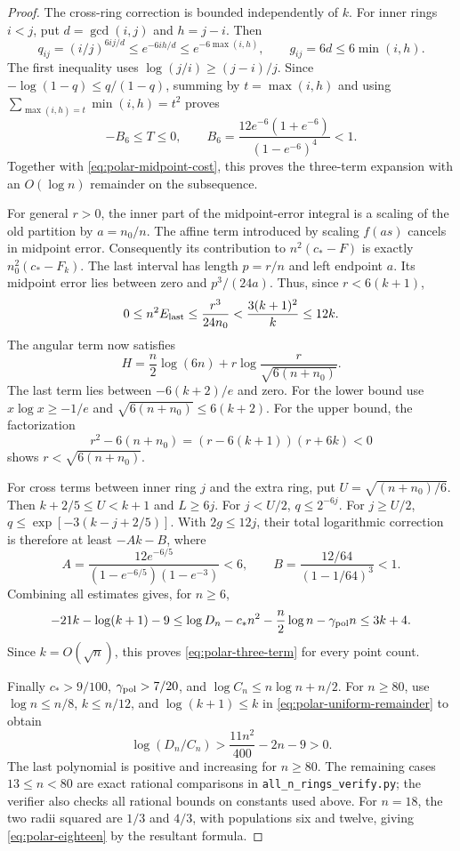 \documentclass[11pt]{article}
\theoremstyle{remark}
\numberwithin{equation}{section}
\begin{document}
\begin{proof}
The cross-ring correction is bounded independently of $k$.
For inner rings $i<j$, put $d=\gcd(i,j)$ and $h=j-i$.
Then
\[
 q_{ij}=(i/j)^{6ij/d}
 \le e^{-6ih/d}\le e^{-6\max(i,h)},
 \qquad g_{ij}=6d\le6\min(i,h).
\]
The first inequality uses $\log(j/i)\ge(j-i)/j$.
Since $-\log(1-q)\le q/(1-q)$, summing by
$t=\max(i,h)$ and using
$\sum_{\max(i,h)=t}\min(i,h)=t^2$ proves
\begin{equation}\label{eq:polar-cross-constant}
 -B_6\le T\le0,\qquad
 B_6=\frac{12e^{-6}(1+e^{-6})}{(1-e^{-6})^4}<1.
\end{equation}
Together with \eqref{eq:polar-midpoint-cost}, this proves the
three-term expansion with an $O(\log n)$ remainder on the
subsequence.

For general $r>0$, the inner part of the midpoint-error integral
is a scaling of the old partition by $a=n_0/n$.
The affine term introduced by scaling $f(as)$ cancels in midpoint
error.  Consequently its contribution to $n^2(c_*-F)$ is
exactly $n_0^2(c_*-F_k)$.
The last interval has length $p=r/n$ and left endpoint $a$.
Its midpoint error lies between zero and $p^3/(24a)$.
Thus, since $r<6(k+1)$,
\[
 0\le n^2E_{\rm last}\le\frac{r^3}{24n_0}
 <\frac{3(k+1)^2}{k}\le12k.
\]
The angular term now satisfies
\[
 H=\frac n2\log(6n)
 +r\log\frac r{\sqrt{6(n+n_0)}}.
\]
The last term lies between $-6(k+2)/e$ and zero.
For the lower bound use $x\log x\ge-1/e$ and
$\sqrt{6(n+n_0)}\le6(k+2)$.
For the upper bound, the factorization
\[
 r^2-6(n+n_0)=(r-6(k+1))(r+6k)<0
\]
shows $r<\sqrt{6(n+n_0)}$.

For cross terms between inner ring $j$ and the extra ring, put
$U=\sqrt{(n+n_0)/6}$.  Then
$k+2/5\le U<k+1$ and $L\ge6j$.
For $j<U/2$, $q\le2^{-6j}$.
For $j\ge U/2$,
$q\le\exp[-3(k-j+2/5)]$.
With $2g\le12j$, their total logarithmic correction is therefore
at least $-Ak-B$, where
\[
 A=\frac{12e^{-6/5}}
 {(1-e^{-6/5})(1-e^{-3})}<6,
 \qquad
 B=\frac{12/64}{(1-1/64)^3}<1.
\]
Combining all estimates gives, for $n\ge6$,
\begin{equation}\label{eq:polar-uniform-remainder}
 -21k-\log(k+1)-9
 \le\log D_n-c_*n^2-\frac n2\log n-\gamma_{\rm pol}n
 \le3k+4.
\end{equation}
Since $k=O(\sqrt n)$, this proves
\eqref{eq:polar-three-term} for every point count.

Finally $c_*>9/100$, $\gamma_{\rm pol}>7/20$, and
$\log C_n\le n\log n+n/2$.
For $n\ge80$, use $\log n\le n/8$,
$k\le n/12$, and $\log(k+1)\le k$ in
\eqref{eq:polar-uniform-remainder} to obtain
\[
 \log(D_n/C_n)>
 \frac{11n^2}{400}-2n-9>0.
\]
The last polynomial is positive and increasing for $n\ge80$.
The remaining cases $13\le n<80$ are exact rational comparisons
in \texttt{all\_n\_rings\_verify.py}; the verifier also checks
all rational bounds on constants used above.
For $n=18$, the two radii squared are $1/3$ and $4/3$,
with populations six and twelve, giving
\eqref{eq:polar-eighteen} by the resultant formula.
\end{proof}
\end{document}
